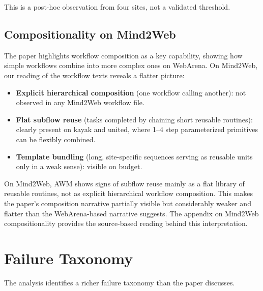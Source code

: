\documentclass{article}
\providecommand{\tightlist}{%
  \setlength{\itemsep}{0pt}\setlength{\parskip}{0.8em}}
\begin{document}
This is a post-hoc observation from four sites, not a validated
threshold.

\subsection{Compositionality on
Mind2Web}\label{compositionality-on-mind2web}

The paper highlights workflow composition as a key capability, showing
how simple workflows combine into more complex ones on WebArena. On
Mind2Web, our reading of the workflow texts reveals a flatter picture:

\begin{itemize}
\tightlist
\item
  \textbf{Explicit hierarchical composition} (one workflow calling
  another): not observed in any Mind2Web workflow file.
\item
  \textbf{Flat subflow reuse} (tasks completed by chaining short
  reusable routines): clearly present on kayak and united, where 1--4
  step parameterized primitives can be flexibly combined.
\item
  \textbf{Template bundling} (long, site-specific sequences serving as
  reusable units only in a weak sense): visible on budget.
\end{itemize}

On Mind2Web, AWM shows signs of subflow reuse mainly as a flat library
of reusable routines, not as explicit hierarchical workflow composition.
This makes the paper's composition narrative partially visible but
considerably weaker and flatter than the WebArena-based narrative
suggests. The appendix on Mind2Web compositionality provides the
source-based reading behind this interpretation.

\section{Failure Taxonomy}\label{failure-taxonomy}

The analysis identifies a richer failure taxonomy than the paper
discusses.
\end{document}
